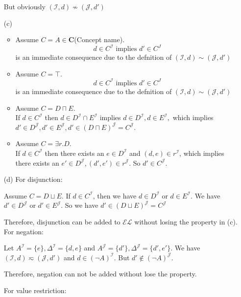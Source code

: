 \documentclass[12pt]{article}
\def \J {\mathcal{J}}
\def \I {\mathcal{I}}
\begin{document}
\begin{enumerate}
        But obviously $ (\mathcal{I}, d) \not\sim (\mathcal{J}, d') $
        \item [(c)]
        \begin{itemize}
            \item Assume $C = A \in \mathbf{C}$(Concept name). 
            $$d \in C^{\I} \text{ implies }d' \in C^{J}$$ is an immediate consequence due to the defnition of $ (\mathcal{I}, d) \sim (\mathcal{J}, d') $
            \item Assume $C=\top$.
            $$d \in C^{\I} \text{ implies }d' \in C^{J}$$ is an immediate consequence due to the defnition of $ (\mathcal{I}, d) \sim (\mathcal{J}, d') $
            \item Assume $C = D \sqcap E$. \\
            If $d\in C^{\mathcal{I}}$ then $d\in D^{\mathcal{I}}\cap E^{\mathcal{I}}$ implies $d\in D^{\mathcal{I}},d\in E^{\mathcal{I}},$ which implies
            $d'\in D^{\mathcal{J}},d'\in E^{\mathcal{J}},d'\in(D\sqcap E)^{\mathcal{J}}=C^{\mathcal{J}}$.
            \item Assume $C=\exists r.D$. \\
            If $d \in C^\mathcal{I}$ then there exists an $e \in D^\mathcal{I}$ and $(d,e)\in r^\mathcal{I}$, which implies there exists an $e' \in D^{\mathcal{J}},(d',e') \in r^{\mathcal{J}}$. So $d' \in C^{\J}$. 
        \end{itemize}
        \item [(d)]
        For disjunction: \par
        Assume $C = D \sqcup E$. If $ d \in C^{\mathcal{I}} $, 
        then we have $ d \in D^{\mathcal{I}} $ or $ d \in E^{\mathcal{I}} $. We have $ d' \in D^{\mathcal{J}} $ or $ d' \in E^{\mathcal{J}} $.
        So we have $ d' \in (D \sqcup E)^{\mathcal{J}} = C^{\J} $ \par
        Therefore, disjunction can be added to $\mathcal{EL}$ without losing the property in (c).
        For negation: \par
        Let $ A^{\mathcal{I}} = \{e\}, \Delta^{\mathcal{I}} = \{d, e\} $ 
        and $ A^{\mathcal{J}} = \{d'\}, \Delta^{\mathcal{J}} = \{d', e'\} $.
        We have $ (\mathcal{I}, d) \eqsim (\mathcal{J}, d') $ and 
        $ d \in (\neg A)^{\mathcal{I}} $.
        But $ d' \notin (\neg A)^{\mathcal{J}}$. \par
        Therefore, negation can not be added without lose the property. \par
        For value restriction: \par

\end{enumerate}
\end{document}
